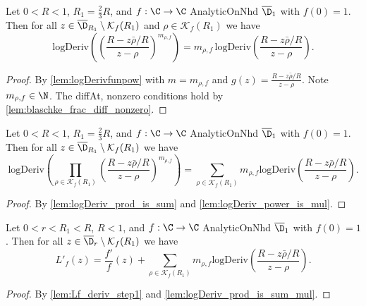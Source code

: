\begin{lemma}\label{lem:logDeriv_power_is_mul} 
\leanok
Let $0<R<1$, $R_1=\frac{2}{3}R$, and $f:\C\to\C$ AnalyticOnNhd $\overline{\D}_1$ with $f(0)=1$. Then for all $z\in \overline{\D}_{R_1}\setminus\mathcal K_f(R_1)$ and $\rho\in\mathcal K_f(R_1)$ we have
\[\text{logDeriv}\left(\left(\frac{R-z\bar\rho/R}{z-\rho}\right)^{m_{\rho,f}}\right) = m_{\rho,f} \,\text{logDeriv}\left(\frac{R-z\bar\rho/R}{z-\rho}\right).\]
\end{lemma}
\begin{proof}
\leanok
{}
By \cref{lem:logDerivfunpow} with $m=m_{\rho,f}$ and $g(z) = \frac{R-z\bar\rho/R}{z-\rho}$.
Note $m_{\rho,f}\in\N$.
The diffAt, nonzero conditions hold by \cref{lem:blaschke_frac_diff_nonzero}.
\end{proof}

\begin{lemma}\label{lem:logDeriv_prod_is_sum_mul} 
\leanok
Let $0<R<1$, $R_1=\frac{2}{3}R$, and $f:\C\to\C$ AnalyticOnNhd $\overline{\D}_1$ with $f(0)=1$. Then for all $z\in \overline{\D}_{R_1}\setminus\mathcal K_f(R_1)$ we have
\[\text{logDeriv}\left(\prod_{\rho\in\mathcal K_f(R_1)}\left(\frac{R-z\bar\rho/R}{z-\rho}\right)^{m_{\rho,f}}\right) = \sum_{\rho\in\mathcal K_f(R_1)}m_{\rho,f} \text{logDeriv}\left(\frac{R-z\bar\rho/R}{z-\rho}\right).\]
\end{lemma}
\begin{proof}
\leanok
{}
By \cref{lem:logDeriv_prod_is_sum} and \cref{lem:logDeriv_power_is_mul}.
\end{proof}

\begin{lemma}\label{lem:Lf_deriv_step2} 
\leanok
Let $0<r<R_1<R$, $R < 1$, and $f:\C\to\C$ AnalyticOnNhd $\overline{\D}_1$ with $f(0)=1$. Then for all $z\in \overline{\D}_{r}\setminus\mathcal K_f(R_1)$ we have
\[L'_f(z)=\frac{f'}{f}(z) + \sum_{\rho\in\mathcal K_f(R_1)}m_{\rho,f} \text{logDeriv}\left(\frac{R-z\bar\rho/R}{z-\rho}\right).\]
\end{lemma}
\begin{proof}
\leanok
{}
By \cref{lem:Lf_deriv_step1} and \cref{lem:logDeriv_prod_is_sum_mul}.
\end{proof}



